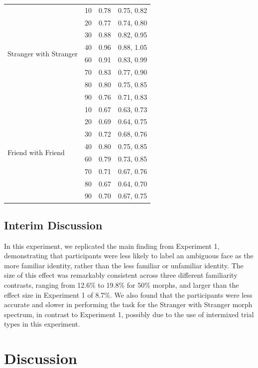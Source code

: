 \documentclass[10pt,letterpaper]{article}
\begin{document}
\begin{table}[ht]
\begin{center}
\begin{tabular}{ | m{3.0cm} | m{3.00cm} | m{3.00cm} | m{2.75cm} |}
\hline
\multirow{8}{2em}{Stranger with Stranger} & 10 & 0.78 & 0.75, 0.82 \\
& 20 & 0.77 & 0.74, 0.80 \\
& 30 & 0.88 & 0.82, 0.95 \\
& 40 & 0.96 & 0.88, 1.05 \\
& 60 & 0.91 & 0.83, 0.99 \\
& 70 & 0.83 & 0.77, 0.90 \\
& 80 & 0.80 & 0.75, 0.85 \\
& 90 & 0.76 & 0.71, 0.83 \\
\hline
\multirow{8}{2em}{Friend with Friend} & 10 & 0.67 & 0.63, 0.73 \\
& 20 & 0.69 & 0.64, 0.75  \\
& 30 & 0.72 & 0.68, 0.76 \\
& 40 & 0.80 & 0.75, 0.85 \\
& 60 & 0.79 & 0.73, 0.85 \\
& 70 & 0.71 & 0.67, 0.76 \\
& 80 & 0.67 & 0.64, 0.70 \\
& 90 & 0.70 & 0.67, 0.75 \\
\hline
\end{tabular}
\end{center}
\end{table}
\clearpage

\subsection*{Interim Discussion}
In this experiment, we replicated the main finding from Experiment 1, demonstrating that participants were less likely to label an ambiguous face as the more familiar identity, rather than the less familiar or unfamiliar identity. The size of this effect was remarkably consistent across three different familiarity contrasts, ranging from 12.6\% to 19.8\% for 50\% morphs, and larger than the effect size in Experiment 1 of 8.7\%. We also found that the participants were less accurate and slower in performing the task for the Stranger with Stranger morph spectrum, in contrast to Experiment 1, possibly due to the use of intermixed trial types in this experiment. 

\section*{Discussion}
\end{document}
